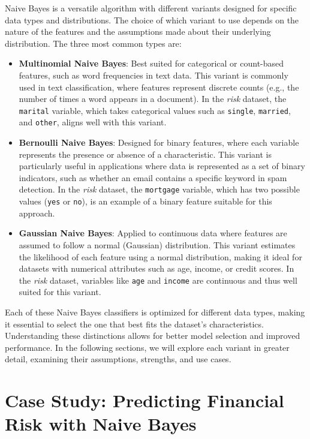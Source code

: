 \documentclass[
]{book}
\newcommand{\passthrough}[1]{#1}
\theoremstyle{definition}
\theoremstyle{definition}
\theoremstyle{definition}
\theoremstyle{definition}
\theoremstyle{remark}
\begin{document}
Naive Bayes is a versatile algorithm with different variants designed for specific data types and distributions. The choice of which variant to use depends on the nature of the features and the assumptions made about their underlying distribution. The three most common types are:

\begin{itemize}
\item
  \textbf{Multinomial Naive Bayes}: Best suited for categorical or count-based features, such as word frequencies in text data. This variant is commonly used in text classification, where features represent discrete counts (e.g., the number of times a word appears in a document). In the \emph{risk} dataset, the \passthrough{\lstinline!marital!} variable, which takes categorical values such as \passthrough{\lstinline!single!}, \passthrough{\lstinline!married!}, and \passthrough{\lstinline!other!}, aligns well with this variant.
\item
  \textbf{Bernoulli Naive Bayes}: Designed for binary features, where each variable represents the presence or absence of a characteristic. This variant is particularly useful in applications where data is represented as a set of binary indicators, such as whether an email contains a specific keyword in spam detection. In the \emph{risk} dataset, the \passthrough{\lstinline!mortgage!} variable, which has two possible values (\passthrough{\lstinline!yes!} or \passthrough{\lstinline!no!}), is an example of a binary feature suitable for this approach.
\item
  \textbf{Gaussian Naive Bayes}: Applied to continuous data where features are assumed to follow a normal (Gaussian) distribution. This variant estimates the likelihood of each feature using a normal distribution, making it ideal for datasets with numerical attributes such as age, income, or credit scores. In the \emph{risk} dataset, variables like \passthrough{\lstinline!age!} and \passthrough{\lstinline!income!} are continuous and thus well suited for this variant.
\end{itemize}

Each of these Naive Bayes classifiers is optimized for different data types, making it essential to select the one that best fits the dataset's characteristics. Understanding these distinctions allows for better model selection and improved performance. In the following sections, we will explore each variant in greater detail, examining their assumptions, strengths, and use cases.

\section{Case Study: Predicting Financial Risk with Naive Bayes}\label{case-study-predicting-financial-risk-with-naive-bayes}
\end{document}
